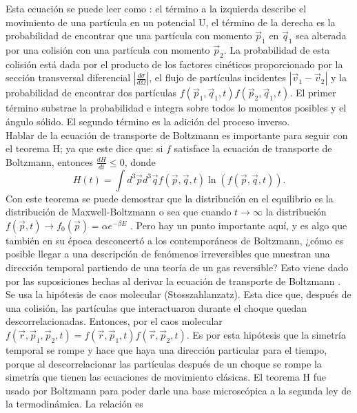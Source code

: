 Esta ecuación se puede leer como \cite{KardarStat}: el término a la izquierda describe el movimiento de una partícula en un potencial U, el término de la derecha es la probabilidad de encontrar que una partícula con momento $\vec{p}_{1}$ en $\vec{q}_{1}$ sea alterada por una colisión con una partícula con momento $\vec{p}_{2}$.  La probabilidad de esta colisión está dada por el producto de los factores cinéticos proporcionado por la sección transversal diferencial $ |\frac{d \sigma}{d \Omega}|$, el flujo de partículas incidentes $|\vec{v}_{1}-\vec{v}_{2}|$ y la probabilidad de encontrar dos partículas $f(\vec{p}_{1},\vec{q}_{1},t)f(\vec{p}_{2},\vec{q}_{1},t)$. El primer término substrae la probabilidad e integra sobre todos lo momentos posibles y el ángulo sólido. El segundo término es la adición del proceso inverso. 
\\
Hablar de la ecuación de transporte de Boltzmann es importante para seguir con el teorema H; ya que este dice que: si $f$ satisface la ecuación de transporte de Boltzmann, entonces $\frac{dH}{dt} \leq 0$, donde 
\begin{equation}
H(t)= \int d^{3} \vec{p} d^{3} \vec{q}  f(\vec{p},\vec{q},t) \ln (f(\vec{p},\vec{q},t)).
\end{equation}
Con este teorema se puede demostrar que la distribución en el equilibrio es la distribución de Maxwell-Boltzmann o sea que cuando $t \to \infty$ la distribución  $f(\vec{p},t) \to f_{0}(\vec{p})=  \alpha e^{-\beta E}$ \cite{HuangStat}. Pero hay un punto importante aquí, y es algo que también en su época desconcertó a los contemporáneos de Boltzmann, ¿cómo es posible llegar a una descripción de fenómenos irreversibles que muestran una dirección temporal partiendo de una teoría de un gas reversible? Esto viene dado por las suposiciones hechas al derivar la ecuación de transporte de Boltzmann \cite{Ehrenfest}.
\\
Se usa la hipótesis de caos molecular (Stosszahlanzatz). Esta dice que, después de una colisión, las partículas que interactuaron durante el choque quedan descorrelacionadas. Entonces, por el caos molecular $f(\vec{r},\vec{p}_{1},\vec{p}_{2},t)=f(\vec{r},\vec{p}_{1},t)f(\vec{r},\vec{p}_{2},t)$. Es por esta hipótesis que la simetría temporal se rompe y hace que haya una dirección particular para el tiempo, porque al descorrelacionar las partículas después de un choque se rompe la simetría que tienen las ecuaciones de movimiento clásicas.
El teorema H fue usado por Boltzmann para poder darle una base microscópica a la segunda ley de la termodinámica. La relación es 
